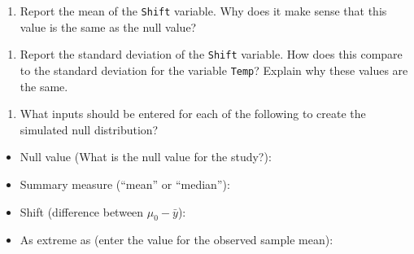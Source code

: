 \documentclass[
]{report}
\providecommand{\tightlist}{%
  \setlength{\itemsep}{0pt}\setlength{\parskip}{0pt}}
\begin{document}
\begin{enumerate}
\def\labelenumi{\arabic{enumi}.}
\setcounter{enumi}{2}
\tightlist
\item
  Report the mean of the \texttt{Shift} variable. Why does it make sense that this value is the same as the null value?
\end{enumerate}

\vspace{0.6in}

\begin{enumerate}
\def\labelenumi{\arabic{enumi}.}
\setcounter{enumi}{3}
\tightlist
\item
  Report the standard deviation of the \texttt{Shift} variable. How does this compare to the standard deviation for the variable \texttt{Temp}? Explain why these values are the same.
\end{enumerate}

\vspace{0.6in}

\begin{enumerate}
\def\labelenumi{\arabic{enumi}.}
\setcounter{enumi}{4}
\tightlist
\item
  What inputs should be entered for each of the following to create the simulated null distribution?
  \vspace{1mm}
\end{enumerate}

\begin{itemize}
\tightlist
\item
  Null value (What is the null value for the study?):
\end{itemize}

\vspace{.15in}

\begin{itemize}
\tightlist
\item
  Summary measure (``mean'' or ``median''):
\end{itemize}

\vspace{0.15in}

\begin{itemize}
\tightlist
\item
  Shift (difference between \(\mu_0 -\bar{y}\)):
\end{itemize}

\vspace{0.15in}

\begin{itemize}
\tightlist
\item
  As extreme as (enter the value for the observed sample mean):
\end{itemize}
\end{document}
